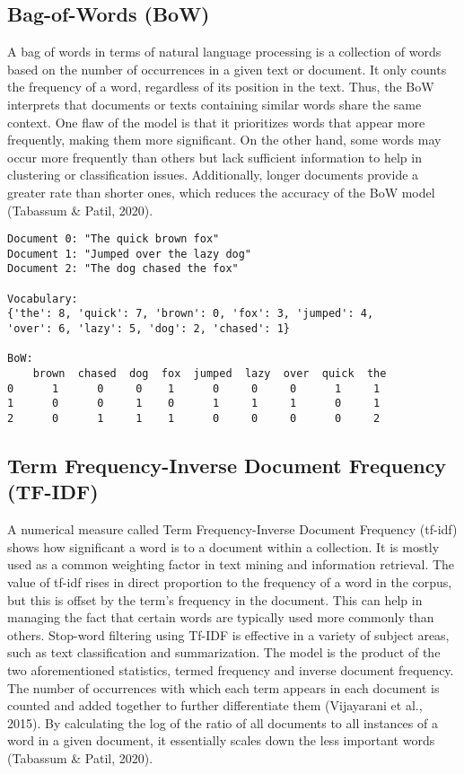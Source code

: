 \subsection{Bag-of-Words (BoW)}

A bag of words in terms of natural language processing is a collection of words based on the number of occurrences in a given text or document. It only counts the frequency of a word, regardless of its position in the text. Thus, the BoW interprets that documents or texts containing similar words share the same context. One flaw of the model is that it prioritizes words that appear more frequently, making them more significant. On the other hand, some words may occur more frequently than others but lack sufficient information to help in clustering or classification issues. Additionally, longer documents provide a greater rate than shorter ones, which reduces the accuracy of the BoW model (Tabassum \& Patil, 2020).

\begin{verbatim}
Document 0: "The quick brown fox"
Document 1: "Jumped over the lazy dog"
Document 2: "The dog chased the fox"

Vocabulary: 
{'the': 8, 'quick': 7, 'brown': 0, 'fox': 3, 'jumped': 4,
'over': 6, 'lazy': 5, 'dog': 2, 'chased': 1}

BoW:
    brown  chased  dog  fox  jumped  lazy  over  quick  the
0      1      0     0    1      0     0     0      1     1
1      0      0     1    0      1     1     1      0     1
2      0      1     1    1      0     0     0      0     2
\end{verbatim}


\subsection{Term Frequency-Inverse Document Frequency (TF-IDF)}

A numerical measure called Term Frequency-Inverse Document Frequency (tf-idf) shows how significant a word is to a document within a collection. It is mostly used as a common weighting factor in text mining and information retrieval. The value of tf-idf rises in direct proportion to the frequency of a word in the corpus, but this is offset by the term's frequency in the document. This can help in managing the fact that certain words are typically used more commonly than others. Stop-word filtering using Tf-IDF is effective in a variety of subject areas, such as text classification and summarization. The model is the product of the two aforementioned statistics, termed frequency and inverse document frequency. The number of occurrences with which each term appears in each document is counted and added together to further differentiate them (Vijayarani et al., 2015). By calculating the log of the ratio of all documents to all instances of a word in a given document, it essentially scales down the less important words (Tabassum \& Patil, 2020).

